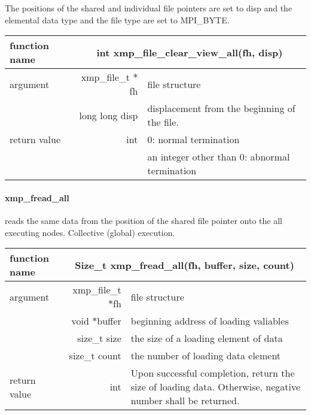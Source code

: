    The positions of the shared and individual file pointers are set to
   disp and 
   the elemental data type and the file type are set to MPI\_BYTE.
   
   \begin{table}[h]
    \begin{center}
     \begin{tabular}{|l|r|p{80mm}|}
      \hline
      {\bf function name}  & \multicolumn{2}{c|}{\bf int xmp\_file\_clear\_view\_all(fh,
      disp)} \\ \hline \hline
      argument & xmp\_file\_t $*$fh & file structure \\ \cline{2-3}
      & long long disp & displacement from the beginning of the file. \\ \hline
      return value & int & 0: normal termination \\
      &  & an integer other than 0: abnormal termination \\ \hline
      \end{tabular}
     \end{center}
    \label{tb:aaa}
   \end{table}

   \paragraph{ xmp\_fread\_all} reads the same data from the position of the shared file
   pointer onto the all executing nodes. Collective (global) execution.

   \begin{table}[h]
    \begin{center}
     \begin{tabular}{|l|r|p{80mm}|}
      \hline
      {\bf function name}  & \multicolumn{2}{c|}{\bf Size\_t
      xmp\_fread\_all(fh, buffer, size, count)}  \\ \hline \hline
      argument & xmp\_file\_t $*$fh & file structure \\ \cline{2-3}
      & void $*$buffer & beginning address of loading valiables \\ \cline{2-3}
      & size\_t size & the size of a loading element of data \\ \cline{2-3}
      & size\_t count & the number of loading data element \\ \hline
      return value & int & Upon successful completion, return the size
	      of loading data. Otherwise, negative number shall be
	      returned. \\ \hline
      \end{tabular}
     \end{center}
    \label{tb:aaa}
   \end{table}

